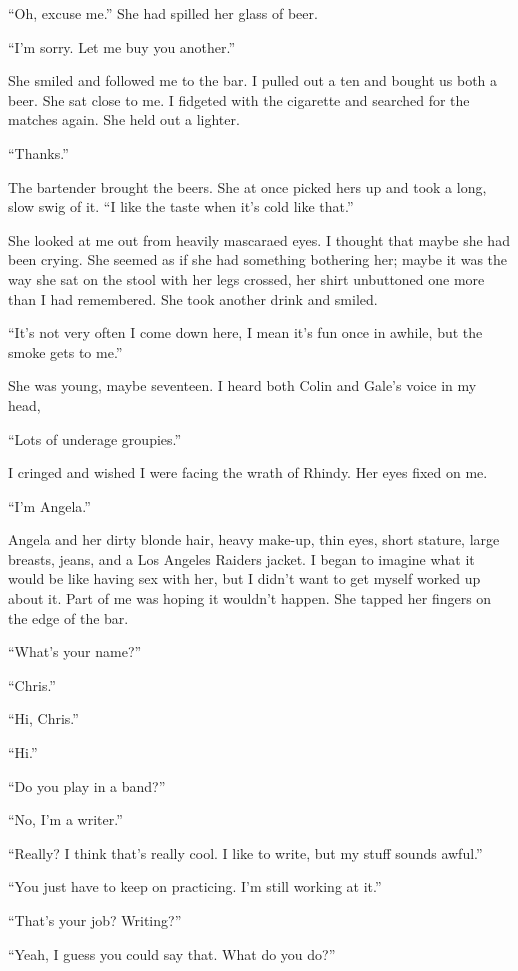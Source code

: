 ``Oh, excuse me.'' She had spilled her glass of beer.

``I'm sorry. Let me buy you another.''

She smiled and followed me to the bar. I pulled out a ten and bought us
both a beer. She sat close to me. I fidgeted with the cigarette and
searched for the matches again. She held out a lighter.

``Thanks.''

The bartender brought the beers. She at once picked hers up and took a
long, slow swig of it. ``I like the taste when it's cold like that.''

She looked at me out from heavily mascaraed eyes. I thought that maybe
she had been crying. She seemed as if she had something bothering her;
maybe it was the way she sat on the stool with her legs crossed, her
shirt unbuttoned one more than I had remembered. She took another drink
and smiled.

``It's not very often I come down here, I mean it's fun once in awhile,
but the smoke gets to me.''

She was young, maybe seventeen. I heard both Colin and Gale's voice in
my head,

``Lots of underage groupies.''

I cringed and wished I were facing the wrath of Rhindy. Her eyes fixed
on me.

``I'm Angela.''

Angela and her dirty blonde hair, heavy make-up, thin eyes, short
stature, large breasts, jeans, and a Los Angeles Raiders jacket. I began
to imagine what it would be like having sex with her, but I didn't want
to get myself worked up about it. Part of me was hoping it wouldn't
happen. She tapped her fingers on the edge of the bar.

``What's your name?''

``Chris.''

``Hi, Chris.''

``Hi.''

``Do you play in a band?''

``No, I'm a writer.''

``Really? I think that's really cool. I like to write, but my stuff
sounds awful.''

``You just have to keep on practicing. I'm still working at it.''

``That's your job? Writing?''

``Yeah, I guess you could say that. What do you do?''

